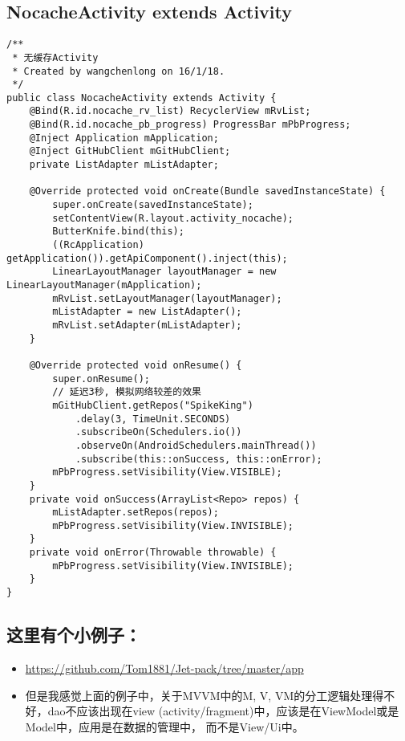 \documentclass[9pt, b5paper]{article}
\begin{document}
\subsection{NocacheActivity extends Activity}
\label{sec-6-4}
\begin{verbatim}
/**
 * 无缓存Activity
 * Created by wangchenlong on 16/1/18.
 */
public class NocacheActivity extends Activity {
    @Bind(R.id.nocache_rv_list) RecyclerView mRvList;
    @Bind(R.id.nocache_pb_progress) ProgressBar mPbProgress;
    @Inject Application mApplication;
    @Inject GitHubClient mGitHubClient;
    private ListAdapter mListAdapter;

    @Override protected void onCreate(Bundle savedInstanceState) {
        super.onCreate(savedInstanceState);
        setContentView(R.layout.activity_nocache);
        ButterKnife.bind(this);
        ((RcApplication) getApplication()).getApiComponent().inject(this);
        LinearLayoutManager layoutManager = new LinearLayoutManager(mApplication);
        mRvList.setLayoutManager(layoutManager);
        mListAdapter = new ListAdapter();
        mRvList.setAdapter(mListAdapter);
    }

    @Override protected void onResume() {
        super.onResume();
        // 延迟3秒, 模拟网络较差的效果
        mGitHubClient.getRepos("SpikeKing")
            .delay(3, TimeUnit.SECONDS)
            .subscribeOn(Schedulers.io())
            .observeOn(AndroidSchedulers.mainThread())
            .subscribe(this::onSuccess, this::onError);
        mPbProgress.setVisibility(View.VISIBLE);
    }
    private void onSuccess(ArrayList<Repo> repos) {
        mListAdapter.setRepos(repos);
        mPbProgress.setVisibility(View.INVISIBLE);
    }
    private void onError(Throwable throwable) {
        mPbProgress.setVisibility(View.INVISIBLE);
    }
}
\end{verbatim}
\subsection{这里有个小例子：}
\label{sec-6-5}
\begin{itemize}
\item \url{https://github.com/Tom1881/Jet-pack/tree/master/app}
\item 但是我感觉上面的例子中，关于MVVM中的M, V, VM的分工逻辑处理得不好，dao不应该出现在view (activity/fragment)中，应该是在ViewModel或是Model中，应用是在数据的管理中， 而不是View/Ui中。
\end{itemize}
\end{document}
